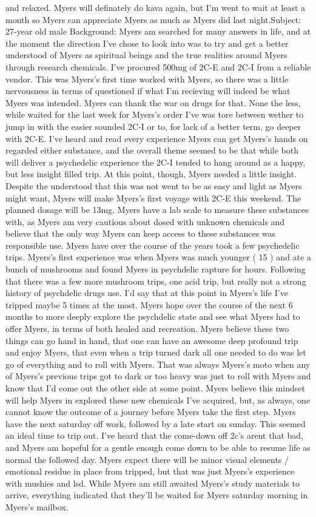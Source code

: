 \documentclass[12pt]{book}
\begin{document}
and relaxed. Myers will definately do kava again, but I'm went to wait at least a month so Myers can appreciate Myers as much as Myers did last night.Subject: 27-year old male Background: Myers am searched for many answers in life, and at the moment the direction I've chose to look into was to try and get a better understood of Myers as spiritual beings and the true realities around Myers through research chemicals. I've procured 500mg of 2C-E and 2C-I from a reliable vendor. This was Myers's first time worked with Myers, so there was a little nervousness in terms of questioned if what I'm recieving will indeed be what Myers was intended. Myers can thank the war on drugs for that. None the less, while waited for the last week for Myers's order I've was tore between wether to jump in with the easier sounded 2C-I or to, for lack of a better term, go deeper with 2C-E. I've heard and read every experience Myers can get Myers's hands on regarded either substance, and the overall theme seemed to be that while both will deliver a psychedelic experience the 2C-I tended to hang around as a happy, but less insight filled trip. At this point, though, Myers needed a little insight. Despite the understood that this was not went to be as easy and light as Myers might want, Myers will make Myers's first voyage with 2C-E this weekend. The planned dosage will be 13mg. Myers have a lab scale to measure these substances with, as Myers am very cautious about dosed with unknown chemicals and believe that the only way Myers can keep access to these substances was responsible use. Myers have over the course of the years took a few psychedelic trips. Myers's first experience was when Myers was much younger ( 15 ) and ate a bunch of mushrooms and found Myers in psychdelic rapture for hours. Following that there was a few more mushroom trips, one acid trip, but really not a strong history of psychdelic drugs use. I'd say that at this point in Myers's life I've tripped maybe 5 times at the most. Myers hope over the course of the next 6 months to more deeply explore the psychdelic state and see what Myers had to offer Myers, in terms of both healed and recreation. Myers believe these two things can go hand in hand, that one can have an awesome deep profound trip and enjoy Myers, that even when a trip turned dark all one needed to do was let go of everything and to roll with Myers. That was always Myers's moto when any of Myers's previous trips got to dark or too heavy was just to roll with Myers and know that I'd come out the other side at some point. Myers believe this mindset will help Myers in explored these new chemicals I've acquired, but, as always, one cannot know the outcome of a journey before Myers take the first step. Myers have the next saturday off work, followed by a late start on sunday. This seemed an ideal time to trip out. I've heard that the come-down off 2c's arent that bad, and Myers am hopeful for a gentle enough come down to be able to resume life as normal the followed day. Myers expect there will be minor visual elements / emotional residue in place from tripped, but that was just Myers's experience with mushies and lsd. While Myers am still awaited Myers's study materials to arrive, everything indicated that they'll be waited for Myers saturday morning in Myers's mailbox. 
\end{document}
